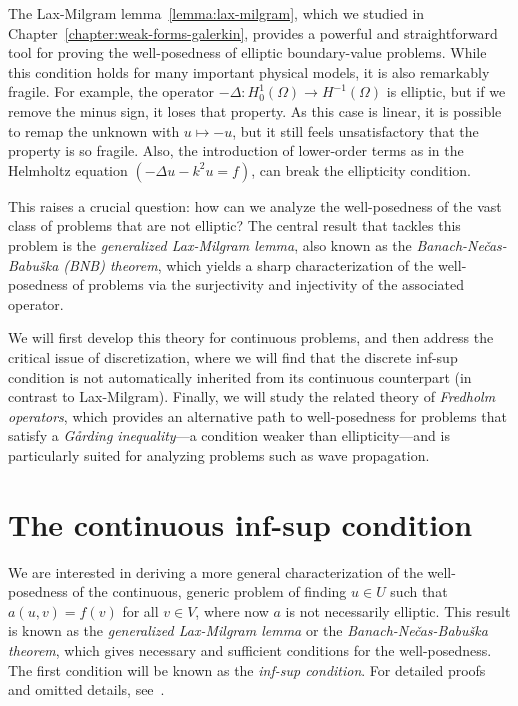 The Lax-Milgram lemma~\ref{lemma:lax-milgram}, which we studied in Chapter~\ref{chapter:weak-forms-galerkin}, provides a powerful and straightforward tool for proving the well-posedness of elliptic boundary-value problems. While this condition holds for many important physical models, it is also remarkably fragile. For example, the operator $-\Delta: H_0^1(\Omega)\to H^{-1}(\Omega)$ is elliptic, but if we remove the minus sign, it loses that property. As this case is linear, it is possible to remap the unknown with $u\mapsto -u$, but it still feels unsatisfactory that the property is so fragile. Also, the introduction of lower-order terms as in the Helmholtz equation $(-\Delta u - k^2 u = f)$, can break the ellipticity condition.

This raises a crucial question: how can we analyze the well-posedness of the vast class of problems that are not elliptic? The central result that tackles this problem is the \emph{generalized Lax-Milgram lemma}, also known as the \emph{Banach-Ne\v{c}as-Babu\v{s}ka (BNB) theorem}, which yields a sharp characterization of the well-posedness of problems via the surjectivity and injectivity of the associated operator.

We will first develop this theory for continuous problems, and then address the critical issue of discretization, where we will find that the discrete inf-sup condition is not automatically inherited from its continuous counterpart (in contrast to Lax-Milgram). Finally, we will study the related theory of \emph{Fredholm operators}, which provides an alternative path to well-posedness for problems that satisfy a \emph{Gårding inequality}---a condition weaker than ellipticity---and is particularly suited for analyzing problems such as wave propagation.

\section{The continuous inf-sup condition}\label{sec:inf-sup}
We are interested in deriving a more general characterization of the well-posedness of the continuous, generic problem of finding $u\in U$ such that $a(u,v)=f(v)$ for all $v\in V$, where now $a$ is not necessarily elliptic. This result is known as the \emph{generalized Lax-Milgram lemma} or the \emph{Banach-Ne\v{c}as-Babu\v{s}ka theorem}, which gives necessary and sufficient conditions for the well-posedness. The first condition will be known as the \emph{inf-sup condition}. For detailed proofs and omitted details, see~\cite{ern2004theory, chen2024infSup, gatica2014simple}. 

